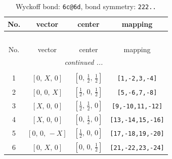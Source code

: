 \documentclass[fleqn,8pt]{jsarticle}
\begin{document}
\begin{longtable}{cccc}
\caption{Wyckoff bond: {\tt 6c@6d}, bond symmetry: {\tt 222..}}
 \\
 \hline \hline
No. & vector & center & mapping \\ \hline \endfirsthead

\multicolumn{3}{l}{\tablename\ \thetable{}} \\
 \hline \hline
No. & vector & center & mapping \\ \hline \endhead

 \hline \hline
\multicolumn{3}{r}{\footnotesize\it continued ...} \\ \endfoot

 \hline \hline
\multicolumn{3}{r}{} \\ \endlastfoot

1 & $\left[ 0,\, X,\, 0 \right]$ & $\left[ 0,\, \frac{1}{2},\, \frac{1}{2} \right]$ & {\tt [1,-2,3,-4]} \\ \hline
2 & $\left[ 0,\, 0,\, X \right]$ & $\left[ \frac{1}{2},\, 0,\, \frac{1}{2} \right]$ & {\tt [5,-6,7,-8]} \\ \hline
3 & $\left[ X,\, 0,\, 0 \right]$ & $\left[ \frac{1}{2},\, \frac{1}{2},\, 0 \right]$ & {\tt [9,-10,11,-12]} \\ \hline
4 & $\left[ X,\, 0,\, 0 \right]$ & $\left[ 0,\, \frac{1}{2},\, 0 \right]$ & {\tt [13,-14,15,-16]} \\ \hline
5 & $\left[ 0,\, 0,\, - X \right]$ & $\left[ \frac{1}{2},\, 0,\, 0 \right]$ & {\tt [17,-18,19,-20]} \\ \hline
6 & $\left[ 0,\, X,\, 0 \right]$ & $\left[ 0,\, 0,\, \frac{1}{2} \right]$ & {\tt [21,-22,23,-24]} \\
\end{longtable}
\renewcommand{\arraystretch}{1.2}
\end{document}
